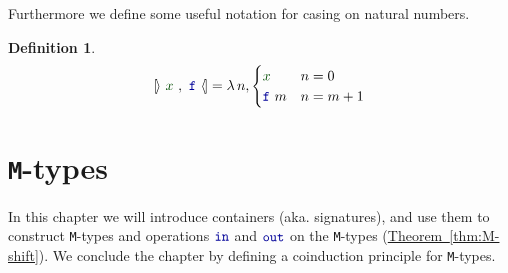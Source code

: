 \documentclass[twoside,11pt,openright]{report}
\theoremstyle{plain} %
\theoremstyle{definition}
\newtheorem{defn}[thm]{Definition}%
\theoremstyle{remark}
\newcommand*{\thmref}[1]{\hyperref[thm:#1]{Theorem~\ref*{thm:#1}}} %
\newcommand*{\term}[1]{\textcolor{green!30!black}{#1}} %
\newcommand*{\function}[1]{\textcolor{blue!60!black}{\ensuremath{\mathtt{#1}}}}
\newcommand*{\natcases}[2]{\ensuremath{\mathbb{[\hspace{-.5mm}\rangle}~\ensuremath{#1}~,~\ensuremath{#2}~\mathbb{\langle\hspace{-.5mm}]}}}
\begin{document}
Furthermore we define some useful notation for casing on natural numbers.
\begin{defn}
  \begin{equation}
    \natcases{\term{x}}{\function{f}} = \lambda\,n, \begin{cases} \term{x} & n = 0 \\ \function{f}~m & n = m + 1 \end{cases}
  \end{equation}
\end{defn}


\chapter{\texttt{M}-types}
\label{ch:m-types}
In this chapter we will introduce containers (aka. signatures), and use them to construct \texttt{M}-types and operations \(\function{in}\) and \(\function{out}\) on the \texttt{M}-types (\thmref{M-shift}). We conclude the chapter by defining a coinduction principle for \texttt{M}-types. 
\end{document}
